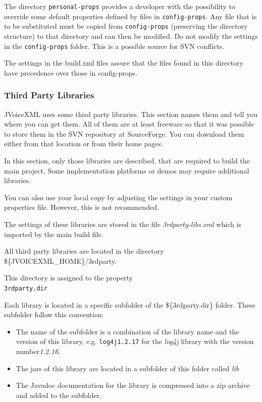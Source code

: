\documentclass[11pt,a4paper]{article}
\begin{document}
The directory \texttt{personal-props} provides a developer with the 
possibility to override some 
default properties defined by files in \texttt{config-props}. 
Any file that is to be
substituted must be copied from \texttt{config-props} 
(preserving the directory structure) to that directory and can then be 
modified. Do not modify the settings in the \texttt{config-props} folder. This
is a possible source for SVN conflicts.

The settings in the build.xml files assure that the files
found in this directory have precedence over those in config-props.

\subsubsection{Third Party Libraries}
\label{sec:third-party-libr}

JVoiceXML uses some third party libraries. This section names them and tell
you where you can get them. All of them are at least freeware
so that it was possible to store them in the SVN repository at
SourceForge. You can download them either from that location or
from their home pages. 

In this section, only those libraries are described, that are required
to build the main project. Some implementation platforms or demos may
require additional libraries.

You can also use your local copy by adjusting the settings in your
custom properties file. However, this is not recommended.

The settings of these libraries are stored in the file \emph{3rdparty-libs.xml}
which is imported by the main build file.

All third party libraries are located in the directory \\
\$\{JVOICEXML\_HOME\}/3rdparty.

This directory is assigned to the property \\
\texttt{3rdparty.dir}

Each library is located in a specific subfolder of the \$\{3rdparty.dir\}
folder. These subfolder follow this convention:

\begin{itemize}
\item The name of the subfolder is a combination of the library name and
the version of this library, e.g. \texttt{log4j1.2.17} for the \emph{log4j}
library with the version number\emph{1.2.16}.
\item The jars of this library are located in a subfolder of this folder
called \emph{lib}
\item The Javadoc documentation for the library is compressed into a zip
archive and added to the subfolder.
\end{itemize}
\end{document}

